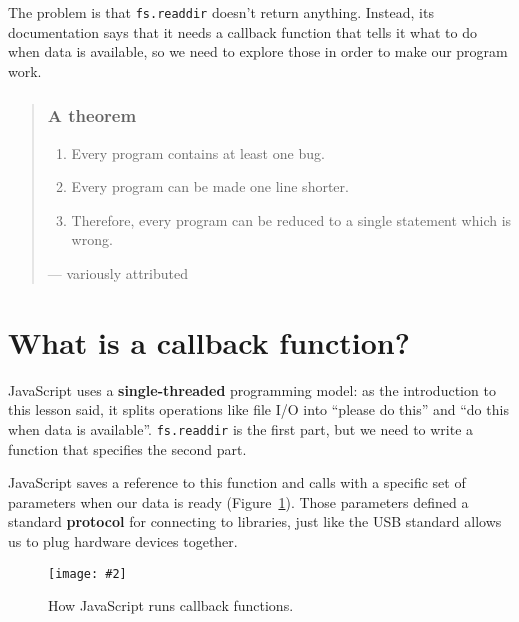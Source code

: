 \documentclass[krantzl]{krantz}
\newcommand{\figpdf}[4]{\begin{figure}%
\centering%
\texttt{[image: \#2]}%
\caption{#3}%
\label{#1}%
\end{figure}}
\newcommand{\figref}[1]{Figure~\ref{#1}}
\newcommand{\glossref}[1]{\textbf{#1}}
\newenvironment{callout}{\savenotes\begin{tBox}\begin{quotation}\toggletrue{inbox}\renewcommand{\thempfootnote}{\arabic{footnote}}}{\end{quotation}\vspace{\baselineskip}\end{tBox}\togglefalse{inbox}\spewnotes}
\begin{document}
The problem is that \texttt{fs.readdir} doesn’t return anything.
Instead,
its documentation says that it needs a callback function
that tells it what to do when data is available,
so we need to explore those in order to make our program work.

\begin{callout}


\subsubsection*{A theorem}

\begin{enumerate}

\item Every program contains at least one bug.

\item Every program can be made one line shorter.

\item Therefore, every program can be reduced to a single statement which is wrong.

\end{enumerate}


\noindent — variously attributed

\end{callout}

\section{What is a callback function?}\label{systems-programming-callback}


JavaScript uses a \glossref{single-threaded} programming model:
as the introduction to this lesson said,
it splits operations like file I/O into “please do this” and “do this when data is available”.
\texttt{fs.readdir} is the first part,
but we need to write a function that specifies the second part.


\newpage


JavaScript saves a reference to this function
and calls with a specific set of parameters when our data is ready
(\figref{systems-programming-callbacks}).
Those parameters defined a standard \glossref{protocol}
for connecting to libraries,
just like the USB standard allows us to plug hardware devices together.

\figpdf{systems-programming-callbacks}{./systems-programming/callbacks.pdf}{How JavaScript runs callback functions.}{0.6}
\end{document}
